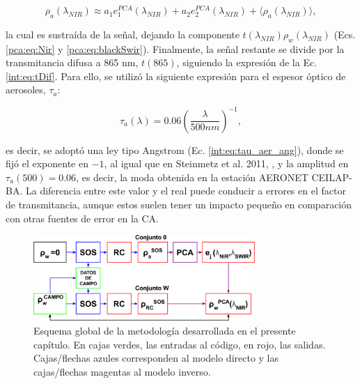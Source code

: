         \begin{equation}
            \rho_{a}(\lambda_{NIR}) \approx a_{1}e_{1}^{PCA}(\lambda_{NIR}) + a_{2}e_{2}^{PCA}(\lambda_{NIR}) + \langle \rho_{a}(\lambda_{NIR}) \rangle,
        \end{equation}
        
        \noindent la cual es sustraída de la señal, dejando la componente $t(\lambda_{NIR})\rho_{w}(\lambda_{NIR})$ (Ecs. \ref{pca:eq:Nir} y \ref{pca:eq:blackSwir}). Finalmente, la señal restante se divide por la transmitancia difusa a 865 nm, $t(865)$, siguiendo la expresión de la Ec. \ref{int:eq:tDif}. Para ello, se utilizó la siguiente expresión para el espesor óptico de aerosoles, $\tau_{a}$:

        
        \begin{equation}
            \tau_{a}(\lambda)=0.06\left(\frac{\lambda}{500 nm}\right)^{-1},
            \label{pca:eq:tau_aer}
        \end{equation}

        
        \noindent es decir, se adoptó una ley tipo Angstrom (Ec. \ref{int:eq:tau_aer_ang}), donde se fijó el exponente en $-1$, al igual que en Steinmetz et al. 2011, \cite{steinmetz2011}, y la amplitud en $\tau_{a}(500)=0.06$, es decir, la moda obtenida en la estación AERONET CEILAP-BA. La diferencia entre este valor y el real puede conducir a errores en el factor de transmitancia, aunque estos suelen tener un impacto pequeño en comparación con otras fuentes de error en la CA.
        

        \begin{figure}
        \centering
        \includegraphics[width=0.75\textwidth]{pca/figures/ESQUEMA.png}
        \caption[Esquema global de la metodología desarrollada para la corrección SWIR-PCA.]{Esquema global de la metodología desarrollada en el presente capítulo. En cajas verdes, las entradas al código, en rojo, las salidas. Cajas/flechas azules corresponden al modelo directo y las cajas/flechas magentas al modelo inverso.}
        \label{pca:ESQUEMA}
        \end{figure}

